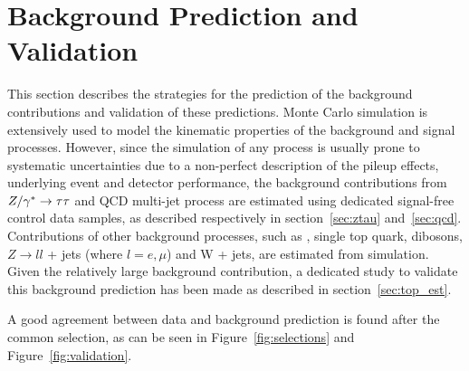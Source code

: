 \section{Background Prediction and Validation}
\label{sec:BackgroundEstimation}

This section describes the strategies for  the prediction of the background contributions and validation of these predictions.
Monte Carlo  simulation is extensively used to model the kinematic properties of the background and signal processes.
However, since the  simulation of any process is usually prone to systematic
uncertainties due to a non-perfect description of the pileup effects,
underlying event and detector performance, the background contributions from 
$Z/\gamma^*\rightarrow \tau\tau$ and QCD multi-jet process are estimated using dedicated signal-free control data samples, 
as described respectively in section~\ref{sec:ztau} and~\ref{sec:qcd}.
Contributions of other background processes, such as \ttbar, single top quark, dibosons, $Z
\rightarrow ll$ + jets (where $l = e,\mu$) and W + jets, are estimated
from simulation. Given the relatively large \ttbar background contribution, a dedicated study to validate
this background prediction has been made as described in section~\ref{sec:top_est}.

A good agreement between data and background prediction is found after the common selection, as can be seen in 
Figure~\ref{fig:selections} and Figure~\ref{fig:validation}.


